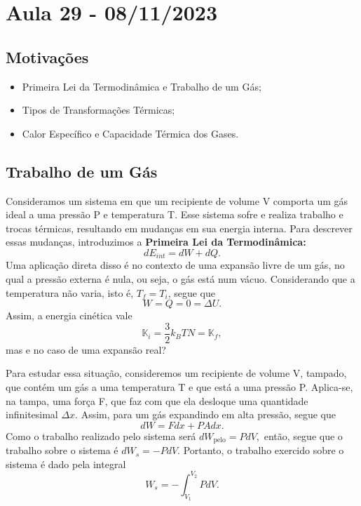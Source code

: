 \documentclass[phsyicsII_notes.tex]{subfiles}
\begin{document}
\section{Aula 29 - 08/11/2023}
\subsection{Motivações}
\begin{itemize}
	\item Primeira Lei da Termodinâmica e Trabalho de um Gás;
	\item Tipos de Transformações Térmicas;
	\item Calor Específico e Capacidade Térmica dos Gases.
\end{itemize}
\subsection{Trabalho de um Gás}
Consideramos um sistema em que um recipiente de volume V comporta um gás ideal a uma pressão P e
temperatura T. Esse sistema sofre e realiza trabalho e trocas térmicas, resultando em mudanças em sua energia interna.
Para descrever essas mudanças, introduzimos a \textbf{Primeira Lei da Termodinâmica:}
\hypertarget{first_thermodynamics}{
	\[
		\boxed{dE_{int} = dW + dQ.}
	\]}
Uma aplicação direta disso é no contexto de uma expansão livre de um gás, no qual a pressão externa é nula, ou seja,
o gás está num vácuo. Considerando que a temperatura não varia, isto é, \(T_{f} = T_{i}\), segue que
\[
	W = Q = 0 = \Delta U.
\]
Assim, a energia cinética vale
\[
	\mathbb{K}_{i} = \frac{3}{2}k_{B}TN = \mathbb{K}_{f},
\]
mas e no caso de uma expansão real?

Para estudar essa situação, consideremos um recipiente de volume V, tampado, que contém um gás a uma temperatura T e que está
a uma pressão P. Aplica-se, na tampa, uma força F, que faz com que ela desloque uma quantidade infinitesimal \(\Delta x\). Assim,
para um gás expandindo em alta pressão, segue que
\[
	dW = Fdx + PAdx.
\]
Como o trabalho realizado pelo sistema será \(dW_{\text{pelo}} = PdV,\) então, segue que o trabalho sobre o sistema é
\(dW_{s} = -PdV\). Portanto, o trabalho exercido sobre o sistema é dado pela integral
\hypertarget{work_gas}{
	\[
		W_{s} = - \int_{V_{1}}^{V_{2}}PdV.
	\]}
\end{document}
